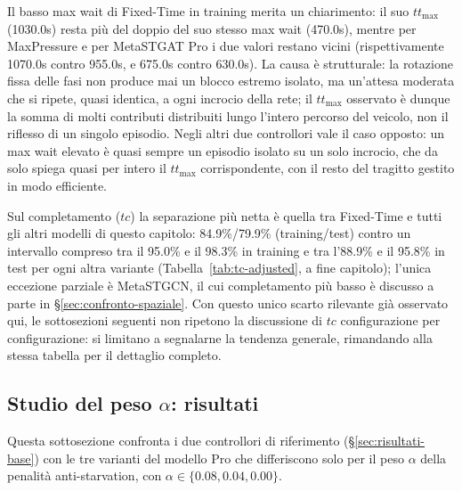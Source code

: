 Il basso max wait di Fixed-Time in training merita un chiarimento: il suo
$tt_{\max}$ (1030.0s) resta più del doppio del suo stesso max wait
(470.0s), mentre per MaxPressure e per MetaSTGAT Pro i due valori restano
vicini (rispettivamente 1070.0s contro 955.0s, e 675.0s contro 630.0s). La
causa è strutturale: la rotazione fissa delle fasi non produce mai un
blocco estremo isolato, ma un'attesa moderata che si ripete, quasi
identica, a ogni incrocio della rete; il $tt_{\max}$ osservato è dunque la
somma di molti contributi distribuiti lungo l'intero percorso del
veicolo, non il riflesso di un singolo episodio. Negli altri due
controllori vale il caso opposto: un max wait elevato è quasi sempre un
episodio isolato su un solo incrocio, che da solo spiega quasi per intero
il $tt_{\max}$ corrispondente, con il resto del tragitto gestito in modo
efficiente.

Sul completamento ($tc$) la separazione più netta è quella tra Fixed-Time
e tutti gli altri modelli di questo capitolo: 84.9\%/79.9\%
(training/test) contro un intervallo compreso tra il 95.0\% e il 98.3\% in
training e tra l'88.9\% e il 95.8\% in test per ogni altra variante
(Tabella~\ref{tab:tc-adjusted}, a fine capitolo); l'unica
eccezione parziale è MetaSTGCN, il cui completamento più basso è discusso
a parte in §\ref{sec:confronto-spaziale}. Con questo unico scarto
rilevante già osservato qui, le sottosezioni seguenti non ripetono la
discussione di $tc$ configurazione per configurazione: si limitano a
segnalarne la tendenza generale, rimandando alla stessa tabella per il
dettaglio completo.

\subsection{Studio del peso \texorpdfstring{$\alpha$}{alpha}: risultati}
\label{sec:risultati-alpha}
\label{sec:equita-alpha}

Questa sottosezione confronta i due controllori di riferimento
(§\ref{sec:risultati-base}) con le tre varianti del modello Pro che
differiscono solo per il peso $\alpha$ della penalità anti-starvation,
con $\alpha \in \{0.08, 0.04, 0.00\}$.

